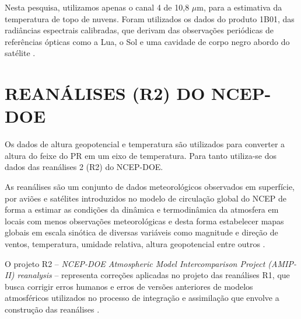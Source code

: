 Nesta pesquisa, utilizamos apenas o canal 4 de 10,8 $\mu$m, para a estimativa da temperatura de topo de nuvens. Foram utilizados os dados do produto 1B01, das radiâncias espectrais calibradas, que derivam das observações periódicas de referências ópticas como a Lua, o Sol e uma cavidade de corpo negro abordo do satélite \cite{kummerok1998}.






\section{REANÁLISES (R2) DO NCEP-DOE}

Os dados de altura geopotencial e temperatura são utilizados para converter a altura do feixe do PR em um eixo de temperatura. Para tanto  utiliza-se dos dados das reanálises 2 (R2) do NCEP-DOE.   


As reanálises são um conjunto de dados meteorológicos observados em superfície, por aviões e satélites introduzidos no modelo de circulação global do NCEP de forma a estimar as condições da dinâmica e termodinâmica da atmosfera em locais com menos observações meteorológicas e desta forma estabelecer mapas globais em escala sinótica de diversas variáveis como magnitude e direção de ventos, temperatura, umidade relativa, altura geopotencial entre outros \cite{kalnay1996ncep}. 


O projeto R2  -- \textit{NCEP-DOE Atmospheric Model Intercomparison Project (AMIP-II) reanalysis} -- representa correções aplicadas no projeto das reanálises R1, que busca corrigir erros humanos e erros de versões anteriores de modelos atmosféricos utilizados no processo de integração e assimilação que envolve a construção das reanálises \cite{kanamitsu}.


